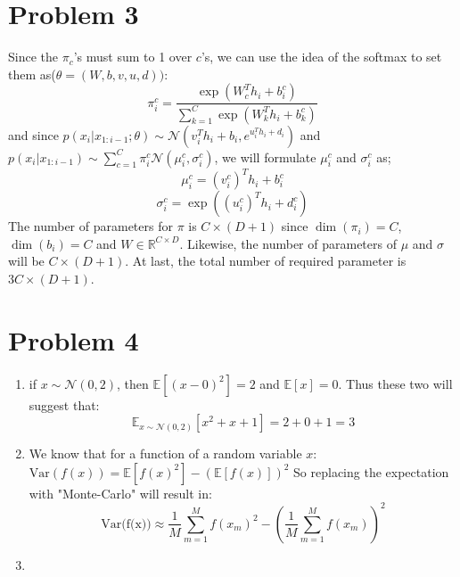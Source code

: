 \documentclass{article}
\begin{document}
\section*{Problem 3}
 Since the $\pi_c$'s must sum to 1 over $c$'s, we can use the idea of the softmax to set them as($\theta = (W,b,v,u,d))$:
\begin{equation*}
    \pi_i^c = \frac{\exp(W_c^T h_i + b_i^c  )}{\sum_{k=1}^C \exp(W_k^T h_i + b_k^c  )}
\end{equation*}
and since $p(x_i | x_{1:i-1}; \theta) \sim \mathcal{N}(v_i^T h_i + b_i, e^{u_i^T h_i + d_i})$ and $p(x_i | x_{1:i-1}) \sim \sum_{c=1}^C \pi_i^c \mathcal{N}(\mu_i^c, \sigma_i^c)$, we will formulate $\mu_i^c$ and $\sigma_i^c$ as;
\begin{equation*}
    \mu_i^c = (v_i^c)^T h_i + b_i^c 
\end{equation*}
\begin{equation*}
    \sigma_i^c = \exp((u_i^c)^T h_i + d_i^c)
\end{equation*}
The number of parameters for $\pi$ is $C \times (D+1) $ since $\dim(\pi_i)=C$, $\dim(b_i)=C$ and $W \in \mathbb{R}^{C \times D}$. Likewise, the number of parameters of $\mu$ and $\sigma$ will be $C \times (D+1)$.
At last, the total number of required parameter is $3C \times (D+1)$. 
\section{Problem 4}
\begin{enumerate}
    \item if $x \sim  \mathcal{N}(0,2)$, then $\mathbb{E}[(x-0)^2] = 2$ and $\mathbb{E}[x] = 0$. Thus these two will suggest that:
    \begin{equation*}
        \mathbb{E}_{x \sim  \mathcal{N}(0,2)}[x^2 + x + 1] = 2 + 0 + 1 = 3
    \end{equation*}
    \item We know that for a function of a random variable $x$: 
    $\text{Var}(f(x)) = \mathbb{E} [f(x)^2] - (\mathbb{E} [f(x)])^2$
    So replacing the expectation with "Monte-Carlo" will result in:
    \begin{equation*}
        \text{Var(f(x))} \approx \frac{1}{M} \sum_{m=1}^M f(x_m)^2 - (\frac{1}{M}   \sum_{m=1}^M f(x_m))^2 
    \end{equation*}
    \item 
\end{enumerate}


\end{document}

